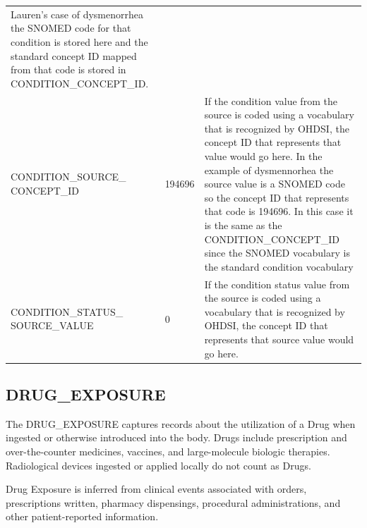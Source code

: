 \documentclass[]{book}
\begin{document}
\begin{longtable}[]{@{}lll@{}}
\begin{minipage}[t]{0.50\columnwidth}
Lauren's case of dysmenorrhea the SNOMED code for that condition is
stored here and the standard concept ID mapped from that code is stored
in CONDITION\_CONCEPT\_ID.\strut
\end{minipage}\tabularnewline
\begin{minipage}[t]{0.27\columnwidth}\raggedright\strut
CONDITION\_SOURCE\_ CONCEPT\_ID\strut
\end{minipage} & \begin{minipage}[t]{0.14\columnwidth}\raggedright\strut
194696\strut
\end{minipage} & \begin{minipage}[t]{0.50\columnwidth}\raggedright\strut
If the condition value from the source is coded using a vocabulary that
is recognized by OHDSI, the concept ID that represents that value would
go here. In the example of dysmennorhea the source value is a SNOMED
code so the concept ID that represents that code is 194696. In this case
it is the same as the CONDITION\_CONCEPT\_ID since the SNOMED vocabulary
is the standard condition vocabulary\strut
\end{minipage}\tabularnewline
\begin{minipage}[t]{0.27\columnwidth}\raggedright\strut
CONDITION\_STATUS\_ SOURCE\_VALUE\strut
\end{minipage} & \begin{minipage}[t]{0.14\columnwidth}\raggedright\strut
0\strut
\end{minipage} & \begin{minipage}[t]{0.50\columnwidth}\raggedright\strut
If the condition status value from the source is coded using a
vocabulary that is recognized by OHDSI, the concept ID that represents
that source value would go here.\strut
\end{minipage}\tabularnewline
\bottomrule
\end{longtable}

\subsection{DRUG\_EXPOSURE}\label{drugExposure}

The DRUG\_EXPOSURE captures records about the utilization of a Drug when
ingested or otherwise introduced into the body. Drugs include
prescription and over-the-counter medicines, vaccines, and
large-molecule biologic therapies. Radiological devices ingested or
applied locally do not count as Drugs.

Drug Exposure is inferred from clinical events associated with orders,
prescriptions written, pharmacy dispensings, procedural administrations,
and other patient-reported information.
\end{document}
